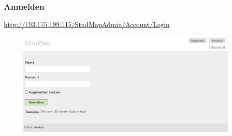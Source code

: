 \subsubsection*{Anmelden}
\href{URL}{http://193.175.199.115/StudMapAdmin/Account/Login}
\begin{figure}[H]
\centering
\includegraphics[width=\linewidth]{../Bilder/Admin/AdminAnmelden}
\label{fig:AdminAnmelden}
\end{figure}

